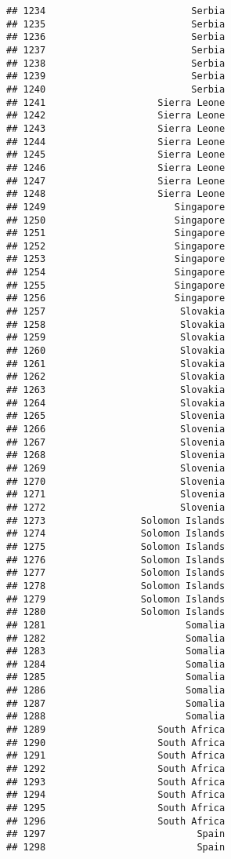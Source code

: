 \documentclass[]{article}
\begin{document}
\begin{verbatim}
## 1234                          Serbia
## 1235                          Serbia
## 1236                          Serbia
## 1237                          Serbia
## 1238                          Serbia
## 1239                          Serbia
## 1240                          Serbia
## 1241                    Sierra Leone
## 1242                    Sierra Leone
## 1243                    Sierra Leone
## 1244                    Sierra Leone
## 1245                    Sierra Leone
## 1246                    Sierra Leone
## 1247                    Sierra Leone
## 1248                    Sierra Leone
## 1249                       Singapore
## 1250                       Singapore
## 1251                       Singapore
## 1252                       Singapore
## 1253                       Singapore
## 1254                       Singapore
## 1255                       Singapore
## 1256                       Singapore
## 1257                        Slovakia
## 1258                        Slovakia
## 1259                        Slovakia
## 1260                        Slovakia
## 1261                        Slovakia
## 1262                        Slovakia
## 1263                        Slovakia
## 1264                        Slovakia
## 1265                        Slovenia
## 1266                        Slovenia
## 1267                        Slovenia
## 1268                        Slovenia
## 1269                        Slovenia
## 1270                        Slovenia
## 1271                        Slovenia
## 1272                        Slovenia
## 1273                 Solomon Islands
## 1274                 Solomon Islands
## 1275                 Solomon Islands
## 1276                 Solomon Islands
## 1277                 Solomon Islands
## 1278                 Solomon Islands
## 1279                 Solomon Islands
## 1280                 Solomon Islands
## 1281                         Somalia
## 1282                         Somalia
## 1283                         Somalia
## 1284                         Somalia
## 1285                         Somalia
## 1286                         Somalia
## 1287                         Somalia
## 1288                         Somalia
## 1289                    South Africa
## 1290                    South Africa
## 1291                    South Africa
## 1292                    South Africa
## 1293                    South Africa
## 1294                    South Africa
## 1295                    South Africa
## 1296                    South Africa
## 1297                           Spain
## 1298                           Spain

\end{verbatim}
\end{document}
